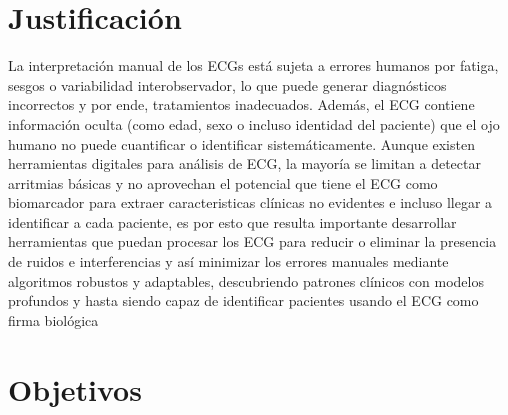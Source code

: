 \documentclass[spanish,11pt,letterpaper,oneside]{memoir}
\begin{document}
\section{Justificación}
	La interpretación manual de los ECGs está sujeta a errores humanos por fatiga, sesgos o variabilidad interobservador, lo que puede generar diagnósticos incorrectos y por ende, tratamientos inadecuados. Además, el ECG contiene información oculta (como edad, sexo o incluso identidad del paciente) que el ojo humano no puede cuantificar o identificar sistemáticamente. Aunque existen herramientas digitales para análisis de ECG, la mayoría se limitan a detectar arritmias básicas y no aprovechan el potencial que tiene el ECG como biomarcador  para extraer caracteristicas clínicas no evidentes e incluso llegar a identificar a cada paciente, es por esto que resulta importante desarrollar herramientas que puedan procesar los ECG para reducir o eliminar la presencia de ruidos e interferencias y así minimizar los errores manuales mediante algoritmos robustos y adaptables, descubriendo patrones clínicos con modelos profundos y hasta siendo capaz de identificar pacientes usando el ECG como firma biológica
	
 

\section{Objetivos}
\end{document}
